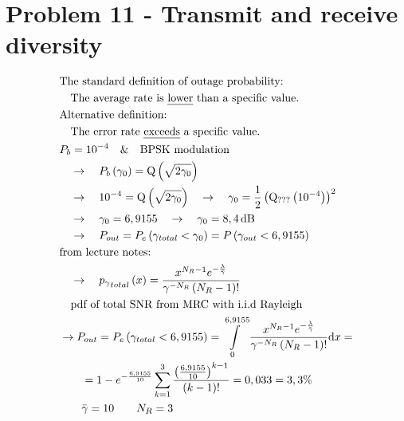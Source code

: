 \section*{Problem 11 - Transmit and receive diversity}
\begin{align*}
	& \text{The standard definition of outage probability:} \\
	& \quad\text{The average rate is \uline{lower} than a specific value.} \\
	& \text{Alternative definition:} \\
	& \quad\text{The error rate \uline{exceeds} a specific value.} \\
	& P_b=10^{-4}\quad\&\quad\text{BPSK modulation} \\
	& \quad\rightarrow\quad P_b\left(\gamma_0\right)=\mathrm{Q}\left(\sqrt{2\gamma_0}\right) \\
	& \quad\rightarrow\quad 10^{-4}=\mathrm{Q}\left(\sqrt{2\gamma_0}\right)\quad\rightarrow\quad\gamma_0=\frac{1}{2}\left(\mathrm{Q_{???}}\left(10^{-4}\right)\right)^2 \\
	& \quad\rightarrow\quad\gamma_0=6,9155\quad\rightarrow\quad\gamma_0=8,4\,\mathrm{dB} \\
	& \quad\rightarrow\quad P_{out}=P_e\left(\gamma_{total}<\gamma_0\right)=P\left(\gamma_{out}<6,9155\right) \\
	& \text{from lecture notes:} \\
	& \quad\rightarrow\quad{p_\gamma}_{total}\left(x\right)=\frac{x^{N_R-1}e^{-\frac{\lambda}{\bar{\gamma}}}}{\gamma^{-N_R}\left(N_R-1\right)!} \\
	& \quad\text{pdf of total SNR from MRC with i.i.d Rayleigh} \\
	& \rightarrow P_{out}=P_e\left(\gamma_{total}<6,9155\right)=\int\limits_0^{6,9155}\frac{x^{N_R-1}e^{-\frac{\lambda}{\bar{\gamma}}}}{\gamma^{-N_R}\left(N_R-1\right)!}\mathrm{d}x= \\
	& \qquad=1-e^{-\frac{6,9155}{10}}\sum\limits_{k=1}^3\frac{\left(\frac{6,9155}{10}\right)^{k-1}}{\left(k-1\right)!}=0,033=3,3\% \\
	& \qquad\bar{\gamma}=10\qquad N_R=3
\end{align*}